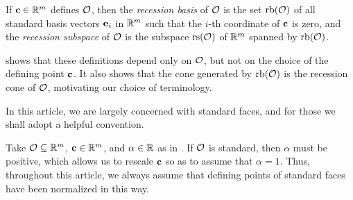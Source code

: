 \documentclass{amsart}
\begin{document}

\begin{definition}
   If $\mathbf{c} \in \mathbb{R}^m$ defines $\mathcal{O}$, then the \emph{recession basis} of $\mathcal{O}$ is the set $\operatorname{rb}(\mathcal{O})$ of all standard basis vectors $\mathbf{e}_i$ in $\mathbb{R}^m$ such that the $i$-th coordinate of $\mathbf{c}$ is zero, and the \emph{recession subspace} of $\mathcal{O}$ is the subspace $\operatorname{rs}(\mathcal{O})$ of $\mathbb{R}^m$ spanned by $\operatorname{rb}(\mathcal{O})$.
\end{definition}

 shows that these definitions depend only on $\mathcal{O}$, but not on the choice of the defining point $\mathbf{c}$.
It also shows that the cone generated by $\operatorname{rb}(\mathcal{O})$ is the recession cone of $\mathcal{O}$, motivating our choice of terminology.

In this article, we are largely concerned with standard faces, and for those we shall adopt a helpful convention.

\begin{convention}
\label{alpha=1: convention}
Take $\mathcal{O} \subseteq \mathbb{R}^m$, $\mathbf{c} \in \mathbb{R}^m$, and $\alpha \in \mathbb{R}$ as in .
If $\mathcal{O}$ is standard, then $\alpha$ must be positive, which allows us to rescale $\mathbf{c}$ so as to assume that $\alpha = 1$.
Thus, throughout this article, we always assume that defining points of standard faces have been normalized in this way.
\end{convention}
\end{document}
